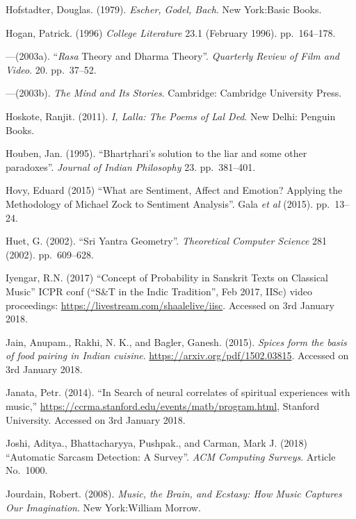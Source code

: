 \begin{thebibliography}{99}
Hofstadter, Douglas. (1979). \textsl{Escher, Godel, Bach}. New York:Basic Books.

Hogan, Patrick. (1996) \textsl{College Literature} 23.1 (February 1996). pp.~164--178.

---\kern3pt(2003a). “\textsl{Rasa} Theory and Dharma Theory”. \textsl{Quarterly Review of Film and Video}. 20. pp.~37--52.

---\kern3pt(2003b). \textsl{The Mind and Its Stories}. Cambridge: Cambridge University Press.

Hoskote, Ranjit. (2011). \textsl{I, Lalla: The Poems of Lal Ded}. New Delhi: Penguin Books.

Houben, Jan. (1995). “Bhartṛhari's solution to the liar and some other paradoxes”. \textsl{Journal of Indian Philosophy} 23. pp.~381--401.

Hovy, Eduard (2015) “What are Sentiment, Affect and Emotion? Applying the Methodology of Michael Zock to Sentiment Analysis”. Gala \textsl{et al} (2015). pp.~13--24.

Huet, G. (2002). “Sri Yantra Geometry”. \textsl{Theoretical Computer Science} 281 (2002). pp.~609--628.

Iyengar, R.N. (2017) “Concept of Probability in Sanskrit Texts on Classical Music” ICPR conf (“S\&T in the Indic Tradition”, Feb 2017, IISc) video proceedings: \url{https://livestream.com/shaalelive/iisc}. Accessed on 3rd January 2018.

Jain, Anupam., Rakhi, N. K., and Bagler, Ganesh. (2015). \textsl{Spices form the basis of food pairing in Indian cuisine}. \url{https://arxiv.org/pdf/1502.03815}. Accessed on 3rd January 2018.

Janata, Petr. (2014). “In Search of neural correlates of spiritual experiences with music,” \url{https://ccrma.stanford.edu/events/matb/program.html}, Stanford University. Accessed on 3rd January 2018.

Joshi, Aditya., Bhattacharyya, Pushpak., and Carman, Mark J. (2018) “Automatic Sarcasm Detection: A Survey”. \textsl{ACM Computing Surveys}. Article No.~1000.

Jourdain, Robert. (2008). \textsl{Music, the Brain, and Ecstasy: How Music Captures Our Imagination}. New York:William Morrow.


\end{thebibliography}
